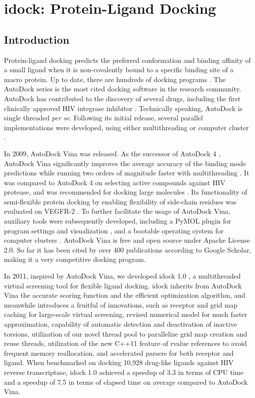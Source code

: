 \chapter{idock: Protein-Ligand Docking}

\section{Introduction}

Protein-ligand docking predicts the preferred conformation and binding affinity of a small ligand when it is non-covalently bound to a specific binding site of a macro protein. Up to date, there are hundreds of docking programs \citep{493,922}. The AutoDock series is the most cited docking software in the research community. AutoDock has contributed to the discovery of several drugs, including the first clinically approved HIV integrase inhibitor \citep{1169}. Technically speaking, AutoDock is single threaded \textit{per se}. Following its initial release, several parallel implementations were developed, using either multithreading or computer cluster \citep{115,560,782}.

In 2009, AutoDock Vina \citep{595} was released. As the successor of AutoDock 4 \citep{596}, AutoDock Vina significantly improves the average accuracy of the binding mode predictions while running two orders of magnitude faster with multithreading \citep{595}. It was compared to AutoDock 4 on selecting active compounds against HIV protease, and was recommended for docking large molecules \citep{556}. Its functionality of semi-flexible protein docking by enabling flexibility of side-chain residues was evaluated on VEGFR-2 \citep{1084}. To further facilitate the usage of AutoDock Vina, auxiliary tools were subsequently developed, including a PyMOL plugin for program settings and visualization \citep{609}, and a bootable operating system for computer clusters \citep{773}. AutoDock Vina is free and open source under Apache License 2.0. So far it has been cited by over 400 publications according to Google Scholar, making it a very competitive docking program.

In 2011, inspired by AutoDock Vina, we developed idock 1.0 \citep{1153}, a multithreaded virtual screening tool for flexible ligand docking. idock inherits from AutoDock Vina the accurate scoring function and the efficient optimization algorithm, and meanwhile introduces a fruitful of innovations, such as receptor and grid map caching for large-scale virtual screening, revised numerical model for much faster approximation, capability of automatic detection and deactivation of inactive torsions, utilization of our novel thread pool to parallelize grid map creation and reuse threads, utilization of the new C++11 feature of rvalue references to avoid frequent memory reallocation, and accelerated parsers for both receptor and ligand. When benchmarked on docking 10,928 drug-like ligands against HIV reverse transcriptase, idock 1.0 achieved a speedup of 3.3 in terms of CPU time and a speedup of 7.5 in terms of elapsed time on average compared to AutoDock Vina.

